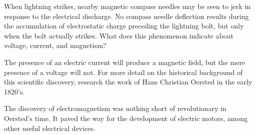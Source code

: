 

When lightning strikes, nearby magnetic compass needles may be seen to jerk in response to the electrical discharge.  No compass needle deflection results during the accumulation of electrostatic charge preceding the lightning bolt, but only when the bolt actually strikes.  What does this phenomenon indicate about voltage, current, and magnetism?







The presence of an electric current will produce a magnetic field, but the mere presence of a voltage will not.  For more detail on the historical background of this scientific discovery, research the work of Hans Christian Oersted in the early 1820's.







The discovery of electromagnetism was nothing short of revolutionary in Oersted's time.  It paved the way for the development of electric motors, among other useful electrical devices.




